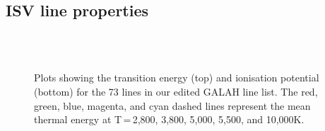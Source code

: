 \subsection{ISV line properties}
\begin{figure}
	\captionsetup{width=.8\textwidth}
    \\
    \\
    \caption{Plots showing the transition energy (top) and ionisation potential (bottom) for the 73 lines in our edited GALAH line list. The red, green, blue, magenta, and cyan dashed lines represent the mean thermal energy at T\,=\,2,800, 3,800, 5,000, 5,500, and 10,000K.}
\end{figure}

